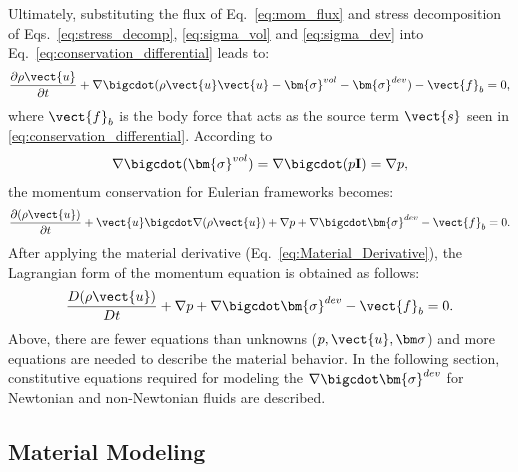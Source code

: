 Ultimately, substituting the flux of Eq.~\ref{eq:mom_flux}  and stress decomposition of Eqs.~\ref{eq:stress_decomp}, \ref{eq:sigma_vol} and \ref{eq:sigma_dev}  into Eq.~\ref{eq:conservation_differential} leads to:
\begin{align}
\frac{\partial \rho \vect{u} }{\partial t}  + \nabla \bigcdot (\rho\vect{u}\vect{u}-\bm{\sigma}^{vol}-\bm{\sigma}^{dev})-\vect{f}_b=0,
\label{eq:Cauchy_momentum}
\end{align}
where $\vect{f}_b$ is the body force that acts as the source term $\vect{s}$ seen in \ref{eq:conservation_differential}. According to  
\begin{align}
\nabla \bigcdot (\bm{\sigma}^{vol})=\nabla \bigcdot (p\mathbf{I})=\nabla p, 
\end{align}
the momentum conservation for Eulerian frameworks becomes:
\begin{align}
\frac{\partial (\rho \vect{u}) }{\partial t}  + \vect{u} \bigcdot \nabla(\rho\vect{u}) + \nabla p+ \nabla \bigcdot \bm{\sigma}^{dev} - \vect{f}_b=0.\label{eq:Cauchy_momentum_Eu}
\end{align}
After applying the material derivative (Eq.~\ref{eq:Material_Derivative}), the Lagrangian form of the momentum equation is obtained as follows:
 \begin{align}
 \frac{D (\rho \vect{u}) }{D t}  + \nabla p+ \nabla \bigcdot \bm{\sigma}^{dev} - \vect{f}_b=0.\label{eq:Cauchy_momentum_La}
 \end{align}
 Above, there are fewer equations than unknowns ($p, \vect{u}, \bm \sigma $) and more equations are needed to describe the material behavior. In the following section, constitutive equations required for modeling the  $\nabla \bigcdot \bm{\sigma}^{dev} $ for Newtonian and non-Newtonian fluids are described.
\subsection{Material Modeling}
